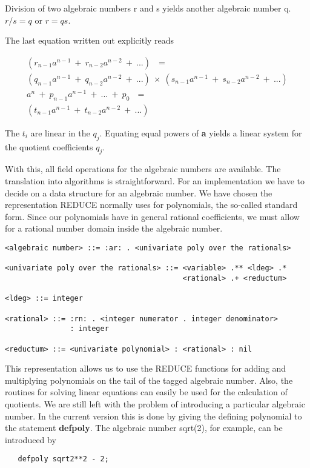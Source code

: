 Division of two algebraic numbers r and s yields another algebraic number q.
$ r/s = q$ or $ r = q s $.

The last equation written out explicitly reads

\begin{eqnarray*}
({r_{n-1}} {a ^{n-1}} ~+~ {r_{n-2}} {a ^{n-2}} ~+~ ...) ~~~ =  \\
({q_{n-1}} {a ^{n-1}} ~+~ {q_{n-2}} {a ^{n-2}} ~+~ ...) ~ \times ~
({s_{n-1}} {a ^{n-1}} ~+~ {s_{n-2}} {a ^{n-2}} ~+~ ...) \\
a^n ~ + ~ {p _{n-1}} {a ^ {n -1}} ~ + ~ ... ~ + ~ {p_0} ~~~ = \\
({t_{n-1}} {a ^{n-1}} ~+~ {t_{n-2}} {a ^{n-2}} ~+~ ...) 
\end{eqnarray*}

The $t_i$ are linear in the $q_j$.  Equating equal powers of {\bf a} yields a
linear system for the quotient coefficients $q_j$.

With this, all field operations for the algebraic numbers are available.
The translation into algorithms is straightforward.  For an implementation
we have to decide on a data structure for an algebraic number.  We have
chosen the representation REDUCE normally uses for polynomials, the so-called standard form.  Since our polynomials have in general rational 
coefficients, we must allow for a rational number domain inside the
algebraic number.

\begin{verbatim}
<algebraic number> ::= :ar: . <univariate poly over the rationals>

<univariate poly over the rationals> ::= <variable> .** <ldeg> .*
                                         <rational> .+ <reductum>

<ldeg> ::= integer

<rational> ::= :rn: . <integer numerator . integer denominator> 
			   : integer

<reductum> ::= <univariate polynomial> : <rational> : nil
\end{verbatim}

This representation allows us to use the REDUCE functions for adding and
multiplying polynomials on the tail of the tagged algebraic number.  Also,
the routines for solving linear equations can easily be used for the
calculation of quotients.  We are still left with the problem of
introducing a particular algebraic number.  In the current version this is
done by giving the defining polynomial to the statement {\bf defpoly}.  The
algebraic number sqrt(2), for example, can be introduced by
\begin{verbatim}
   defpoly sqrt2**2 - 2;
\end{verbatim}

